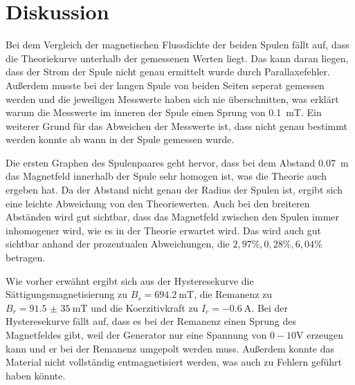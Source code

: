 \section{Diskussion}

Bei dem Vergleich der magnetischen Flussdichte der beiden Spulen fällt auf, dass
die Theoriekurve unterhalb der gemessenen Werten liegt. Das kann daran liegen, dass
der Strom der Spule nicht genau ermittelt wurde durch Parallaxefehler. Außerdem
musste bei der langen Spule von beiden Seiten seperat gemessen werden und die jeweiligen
Messwerte haben sich nie überschnitten, was erklärt warum die Messwerte im inneren
der Spule einen Sprung von \SI{0.1}{\milli\tesla}. Ein weiterer Grund für das Abweichen der
Messwerte ist, dass nicht genau bestimmt werden konnte ab wann in der Spule gemessen wurde.

Die ersten Graphen des Spulenpaares geht hervor, dass bei dem Abstand \SI{0.07}{\meter}
das Magnetfeld innerhalb der Spule sehr homogen ist, was die Theorie auch ergeben hat.
Da der Abstand nicht genau der Radius der Spulen ist, ergibt sich eine leichte Abweichung
von den Theoriewerten. Auch bei den breiteren Abständen wird gut sichtbar, dass
das Magnetfeld zwischen den Spulen immer inhomogener wird, wie es in der Theorie
erwartet wird. Das wird auch gut sichtbar anhand der prozentualen Abweichungen, die
$2,97 \% , 0,28\% , 6,04 \%$ betragen.

Wie vorher erwähnt ergibt sich aus der Hysteresekurve die Sättigungsmagnetisierung
zu $B_s = \SI{694.2}{\milli\tesla}$, die Remanenz zu $B_r = \SI{91.5(350)}{\milli\tesla}$ und
die Koerzitivkraft zu $I_c = \SI{-0.6}{\ampere}$.
Bei der Hysteresekurve fällt auf, dass es bei der Remanenz einen Sprung des Magnetfeldes
gibt, weil der Generator nur eine Spannung von $0-10\si{\volt}$ erzeugen kann und
er bei der Remanenz umgepolt werden muss. Außerdem konnte das Material nicht vollständig
entmagnetisiert werden, was auch zu Fehlern geführt haben könnte.
